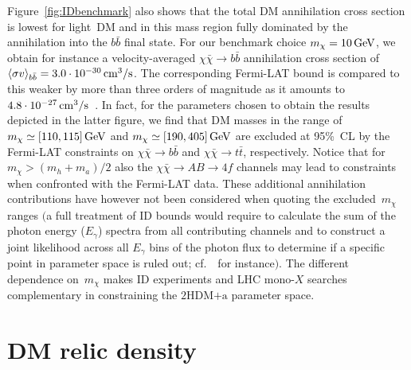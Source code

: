 \documentclass[a4paper, 11pt,notoc]{article}
\newcommand{\hdma}{\ensuremath{\textrm{2HDM+a}}\xspace}
\begin{document}
Figure~\ref{fig:IDbenchmark} also shows that the total DM annihilation cross section is lowest for light~DM and in this mass region fully dominated by the annihilation into the $b \bar b$ final state. For our benchmark choice $m_\chi = 10 \, {\rm GeV}$, we obtain  for instance a velocity-averaged $\chi \bar \chi \to b \bar b$ annihilation cross section   of  $\langle \sigma v \rangle_{b \bar b} = 3.0 \cdot 10^{-30} \, {\rm cm}^3/{\rm s}$. The corresponding Fermi-LAT bound is compared to this weaker by more than three orders of magnitude as it amounts to $4.8 \cdot 10^{-27} \, {\rm cm}^3/{\rm s}$~\cite{Fermi-LAT:2016uux}.  In fact, for the parameters chosen to obtain the results depicted in the latter figure, we find that DM masses in the range of $m_\chi \simeq [110, 115] \, {\rm GeV}$ and $m_\chi \simeq [190, 405] \, {\rm GeV}$ are excluded at 95\%~CL by the Fermi-LAT constraints on $\chi \bar \chi \to b \bar b$ and $\chi \bar \chi \to t \bar t$, respectively. Notice that for $m_\chi > (m_h + m_a)/2$ also the $\chi \bar \chi \to A B \to 4f$ channels may lead to constraints when confronted with the Fermi-LAT data. These additional annihilation contributions have however not been considered when quoting the excluded~$m_\chi$ ranges $\big($a full treatment of ID bounds would require to calculate the sum of the photon energy ($E_\gamma$) spectra  from all contributing channels and to construct a joint  likelihood across all $E_\gamma$ bins of the photon flux to determine if a specific point in parameter space is ruled out; cf.~\cite{Carpenter:2015xaa,Carpenter:2016thc}~for instance$\big)$. The different dependence on~$m_\chi$ makes ID experiments and LHC mono-$X$ searches    complementary in constraining the \hdma parameter space. 


\section{DM relic density}
\label{sec:relic}
\end{document}
